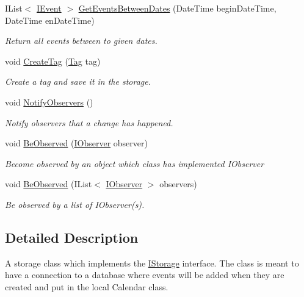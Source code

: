 \begin{DoxyCompactItemize}
I\+List$<$ \hyperlink{interface_calendar_system_1_1_model_1_1_i_event}{I\+Event} $>$ \hyperlink{class_calendar_system_1_1_data_storage_1_1_database_storage_a168ecf83f6b5d8686fedd72c422b4486}{Get\+Events\+Between\+Dates} (Date\+Time begin\+Date\+Time, Date\+Time en\+Date\+Time)
\begin{DoxyCompactList}\small\item\em Return all events between to given dates. \end{DoxyCompactList}\item 
void \hyperlink{class_calendar_system_1_1_data_storage_1_1_database_storage_aee69c1fc20000371ee89ac06617d3610}{Create\+Tag} (\hyperlink{class_calendar_system_1_1_model_1_1_tag}{Tag} tag)
\begin{DoxyCompactList}\small\item\em Create a tag and save it in the storage. \end{DoxyCompactList}\item 
void \hyperlink{class_calendar_system_1_1_data_storage_1_1_database_storage_a9dde52dd67fc234b5f4ed217801968af}{Notify\+Observers} ()
\begin{DoxyCompactList}\small\item\em Notify observers that a change has happened. \end{DoxyCompactList}\item 
void \hyperlink{class_calendar_system_1_1_data_storage_1_1_database_storage_a6a80bdff8f3619508f20afdb3dddf650}{Be\+Observed} (\hyperlink{interface_calendar_system_1_1_model_1_1_i_observer}{I\+Observer} observer)
\begin{DoxyCompactList}\small\item\em Become observed by an object which class has implemented I\+Observer \end{DoxyCompactList}\item 
void \hyperlink{class_calendar_system_1_1_data_storage_1_1_database_storage_a21c41a45e85e0ace4e49838659587934}{Be\+Observed} (I\+List$<$ \hyperlink{interface_calendar_system_1_1_model_1_1_i_observer}{I\+Observer} $>$ observers)
\begin{DoxyCompactList}\small\item\em Be observed by a list of I\+Observer(s). \end{DoxyCompactList}\end{DoxyCompactItemize}


\subsection{Detailed Description}
A storage class which implements the \hyperlink{interface_calendar_system_1_1_data_storage_1_1_i_storage}{I\+Storage} interface. The class is meant to have a connection to a database where events will be added when they are created and put in the local Calendar class. 



